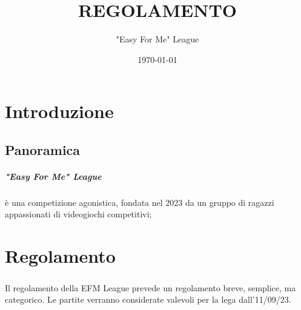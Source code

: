 \documentclass[a4paper, 12pt]{report}
\begin{document}
\title{\textbf{REGOLAMENTO}}
\author{"Easy For Me" League}
\date{\today}
\maketitle
\tableofcontents
\chapter{Introduzione}
\section{Panoramica}
\paragraph{"Easy For Me" League} è una competizione agonistica, fondata nel 2023 da un gruppo di ragazzi appassionati di videogiochi competitivi;
\chapter{Regolamento}
\paragraph{}Il regolamento della EFM League prevede un regolamento breve, semplice, ma categorico. Le partite verranno considerate valevoli per la lega dall'11/09/23.
\end{document}
